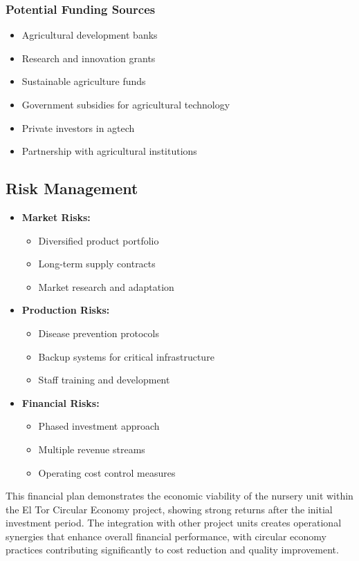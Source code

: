 \subsubsection{Potential Funding Sources}
\begin{itemize}
    \item Agricultural development banks
    \item Research and innovation grants
    \item Sustainable agriculture funds
    \item Government subsidies for agricultural technology
    \item Private investors in agtech
    \item Partnership with agricultural institutions
\end{itemize}

\subsection{Risk Management}
\begin{itemize}
    \item \textbf{Market Risks:}
    \begin{itemize}
        \item Diversified product portfolio
        \item Long-term supply contracts
        \item Market research and adaptation
    \end{itemize}
    
    \item \textbf{Production Risks:}
    \begin{itemize}
        \item Disease prevention protocols
        \item Backup systems for critical infrastructure
        \item Staff training and development
    \end{itemize}
    
    \item \textbf{Financial Risks:}
    \begin{itemize}
        \item Phased investment approach
        \item Multiple revenue streams
        \item Operating cost control measures
    \end{itemize}
\end{itemize}

This financial plan demonstrates the economic viability of the nursery unit within the El Tor Circular Economy project, showing strong returns after the initial investment period. The integration with other project units creates operational synergies that enhance overall financial performance, with circular economy practices contributing significantly to cost reduction and quality improvement. 